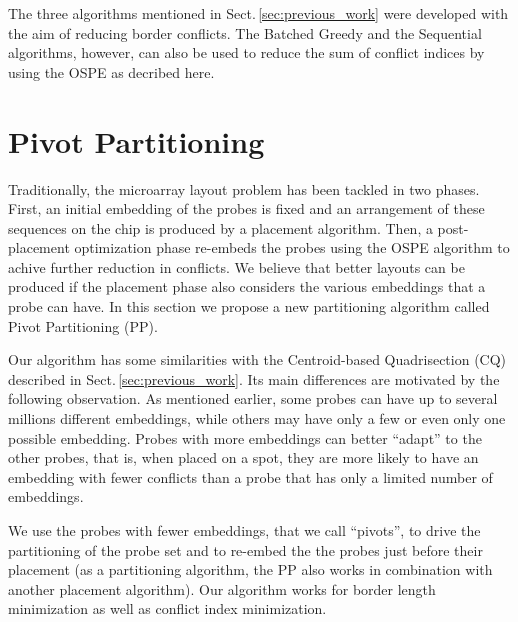 \documentclass[runningheads]{llncs}
\begin{document}
The three algorithms mentioned in Sect.\,\ref{sec:previous_work} were developed with
the aim of reducing border conflicts. The Batched Greedy and the Sequential algorithms,
however, can also be used to reduce the sum of conflict indices by using the OSPE as
decribed here.

\section{Pivot Partitioning}
\label{sec:pivotpart}

Traditionally, the microarray layout problem has been tackled in two phases. First,
an initial embedding of the probes is fixed and an arrangement of these sequences
on the chip is produced by a placement algorithm. Then, a post-placement optimization
phase re-embeds the probes using the OSPE algorithm to achive further reduction in
conflicts. We believe that better layouts can be produced if the placement phase
also considers
the various embeddings that a probe can have. In this section we propose a new
partitioning algorithm called Pivot Partitioning (PP).

Our algorithm
has some similarities with the Centroid-based Quadrisection (CQ) described
in Sect.\,\ref{sec:previous_work}.
Its main differences are motivated by the following observation.
As mentioned earlier, some probes can have up to several millions different
embeddings, while others may have only a few or even only one possible embedding.
Probes with more embeddings can better
``adapt'' to the other probes, that is, when placed on a spot, they are more likely
to have an embedding with fewer conflicts than a probe that has
only a limited number of embeddings.

We use the probes with fewer embeddings, that we call ``pivots'', to drive the
partitioning of the probe set and to re-embed the the probes just before their
placement (as a partitioning algorithm, the PP also works in combination with
another placement algorithm). Our algorithm works for border length minimization
as well as conflict index minimization.
\end{document}
